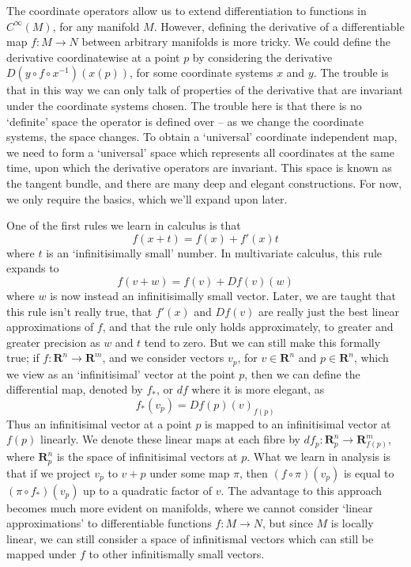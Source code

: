 The coordinate operators allow us to extend differentiation to functions in $C^\infty(M)$, for any manifold $M$. However, defining the derivative of a differentiable map $f: M \to N$ between arbitrary manifolds is more tricky. We could define the derivative coordinatewise at a point $p$ by considering the derivative $D(y \circ f \circ x^{-1})(x(p))$, for some coordinate systems $x$ and $y$. The trouble is that in this way we can only talk of properties of the derivative that are invariant under the coordinate systems chosen. The trouble here is that there is no `definite' space the operator is defined over -- as we change the coordinate systems, the space changes. To obtain a `universal' coordinate independent map, we need to form a `universal' space which represents all coordinates at the same time, upon which the derivative operators are invariant. This space is known as the tangent bundle, and there are many deep and elegant constructions. For now, we only require the basics, which we'll expand upon later.

One of the first rules we learn in calculus is that
%
\[ f(x + t) = f(x) + f'(x) t\]
%
where $t$ is an `infinitisimally small' number. In multivariate calculus, this rule expands to
%
\[ f(v + w) = f(v) + Df(v)(w) \]
%
where $w$ is now instead an infinitisimally small vector. Later, we are taught that this rule isn't really true, that $f'(x)$ and $Df(v)$ are really just the best linear approximations of $f$, and that the rule only holds approximately, to greater and greater precision as $w$ and $t$ tend to zero. But we can still make this formally true; if $f: \mathbf{R}^n \to \mathbf{R}^m$, and we consider vectors $v_p$, for $v \in \mathbf{R}^n$ and $p \in \mathbf{R}^n$, which we view as an `infinitisimal' vector at the point $p$, then we can define the differential map, denoted by $f_*$, or $df$ where it is more elegant, as
%
\[ f_*(v_p) = Df(p)(v)_{f(p)} \]
%
Thus an infinitisimal vector at a point $p$ is mapped to an infinitisimal vector at $f(p)$ linearly. We denote these linear maps at each fibre by $df_p: \mathbf{R}^n_p \to \mathbf{R}^m_{f(p)}$, where $\mathbf{R}^n_p$ is the space of infinitisimal vectors at $p$. What we learn in analysis is that if we project $v_p$ to $v + p$ under some map $\pi$, then $(f \circ \pi)(v_p)$ is equal to $(\pi \circ f_*)(v_p)$ up to a quadratic factor of $v$. The advantage to this approach becomes much more evident on manifolds, where we cannot consider `linear approximations' to differentiable functions $f: M \to N$, but since $M$ is locally linear, we can still consider a space of infinitismal vectors which can still be mapped under $f$ to other infinitismally small vectors.

